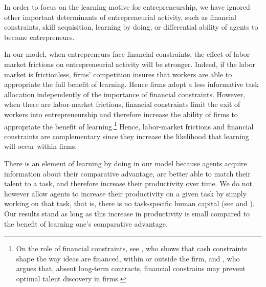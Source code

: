 \documentclass[12pt,american]{paper}
\theoremstyle{remark}
\begin{document}
In order to focus on the learning motive for entrepreneurship, we have ignored other important determinants of entrepreneurial activity, such as financial constraints, skill acquisition, learning by doing, or differential ability of agents to become entrepreneurs.

In our model,  %
when entrepreneurs face financial constraints, the effect of labor market frictions on entrepreneurial activity will be stronger. 
Indeed, if the labor market is frictionless, firms' competition insures that workers are able to appropriate the full benefit of learning.  
Hence firms adopt a less informative task allocation independently of the importance of financial constraints.  
However, when there are labor-market frictions, financial constraints limit the exit of workers into entrepreneurship and therefore increase the ability of firms to appropriate the benefit of learning.\footnote{On the role of financial constraints, see \citet{Hellmann:2007tk}, who shows that cash constraints shape the way ideas are financed, within or outside the firm, and \citet{tervio_superstars_2009}, who argues that, absent long-term contracts, financial constrains may prevent optimal talent discovery in firms.} Hence, labor-market frictions and financial constraints are complementary since they increase the likelihood that learning will occur within firms.%

There is an element of learning by doing in our model because agents acquire information about their comparative advantage, are better able to match their talent to a task, and therefore increase their productivity over time.  
We do not however allow agents to increase their productivity on a given task by simply working on that task, that is, there is no task-specific human capital (see \citealp{gibbons1999theory} and \citealp{gibbons2004task}).
Our results stand as long as this increase in productivity is small compared to the benefit of learning one's comparative advantage.  
  
\end{document}
